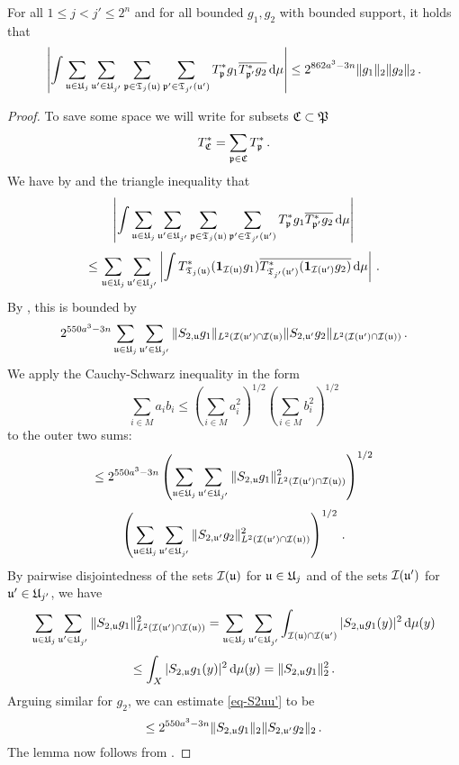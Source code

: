 \begin{lemma}
    \label{row-correlation}
    \leanok
    For all $1 \le j < j' \le 2^n$ and for all bounded $g_1, g_2$ with bounded support, it holds that
    $$
        \left| \int \sum_{{\mathfrak u} \in {\mathfrak U}_j} \sum_{{\mathfrak u}' \in {\mathfrak U}_{j'}} \sum_{{\mathfrak p} \in {\mathfrak T}_j({\mathfrak u})} \sum_{{\mathfrak p}' \in {\mathfrak T}_{j'}({\mathfrak u}')} T^*_{{\mathfrak p}} g_1 \overline{T^*_{{\mathfrak p}'} g_2} \, \mathrm{d}\mu \right| \le
        2^{862a^3-3n}\|g_1\|_2 \|g_2\|_2\,.
    $$
\end{lemma}

\begin{proof}
    To save some space we will write for subsets ${\mathfrak C} \subset {\mathfrak P}$
    $$
        T_{{\mathfrak C}}^* = \sum_{{\mathfrak p} \in {\mathfrak C}} T_{{\mathfrak p}}^*\,.
    $$
    We have by  and the triangle inequality that
    $$
        \left| \int \sum_{{\mathfrak u} \in {\mathfrak U}_j} \sum_{{\mathfrak u}' \in {\mathfrak U}_{j'}} \sum_{{\mathfrak p} \in {\mathfrak T}_j({\mathfrak u})} \sum_{{\mathfrak p}' \in {\mathfrak T}_{j'}({\mathfrak u}')} T^*_{{\mathfrak p}} g_1 \overline{T^*_{{\mathfrak p}'} g_2} \, \mathrm{d}\mu \right|
    $$
    $$
        \le \sum_{{\mathfrak u} \in {\mathfrak U}_j} \sum_{{\mathfrak u}' \in {\mathfrak U}_{j'}} \left| \int T^*_{{\mathfrak T}_j({\mathfrak u})} (\mathbf{1}_{{\mathcal{I}}({\mathfrak u})} g_1) \overline{T^*_{{\mathfrak T}_{j'}({\mathfrak u}')} (\mathbf{1}_{{\mathcal{I}}({\mathfrak u}')} g_2)} \, \mathrm{d}\mu \right|\,.
    $$
    By , this is bounded by
    \begin{equation}
        \label{eq-S2uu'}
         2^{550a^3-3n} \sum_{{\mathfrak u} \in {\mathfrak U}_j} \sum_{{\mathfrak u}' \in {\mathfrak U}_{j'}} \|S_{2,{\mathfrak u}} g_1\|_{L^2({\mathcal{I}}({\mathfrak u}')\cap {\mathcal{I}}({\mathfrak u})} \|S_{2, {\mathfrak u}'} g_2\|_{L^2({\mathcal{I}}({\mathfrak u}')\cap{\mathcal{I}}({\mathfrak u}))}\,.
    \end{equation}
    We apply the Cauchy-Schwarz inequality in the form
    \begin{equation*}
        \sum_{i \in M} a_i b_i \le (\sum_{i \in M} a_i^2 )^{1/2}(\sum_{i \in M} b_i^2 )^{1/2}
    \end{equation*} to the outer two sums:
    $$
        \le 2^{550a^3-3n} \left(\sum_{{\mathfrak u} \in {\mathfrak U}_j} \sum_{{\mathfrak u}' \in {\mathfrak U}_{j'}} \|S_{2,{\mathfrak u}} g_1\|_{L^2({\mathcal{I}}({\mathfrak u}')\cap {\mathcal{I}}({\mathfrak u}))}^2 \right)^{1/2}
    $$
    $$
        \left(\sum_{{\mathfrak u} \in {\mathfrak U}_j} \sum_{{\mathfrak u}' \in {\mathfrak U}_{j'}} \|S_{2,{\mathfrak u}'} g_2\|_{L^2({\mathcal{I}}({\mathfrak u}')\cap{\mathcal{I}}({\mathfrak u}))}^2 \right)^{1/2}\,.
    $$
    By pairwise disjointedness of the sets ${\mathcal{I}}({\mathfrak u})$ for ${\mathfrak u} \in {\mathfrak U}_j$ and of the sets ${\mathcal{I}}({\mathfrak u}')$ for ${\mathfrak u}' \in {\mathfrak U}_{j'}$, we have
    $$
        \sum_{{\mathfrak u} \in {\mathfrak U}_j}\sum_{{\mathfrak u}' \in {\mathfrak U}_{j'}} \|S_{2,{\mathfrak u}} g_1\|_{L^2({\mathcal{I}}({\mathfrak u}')\cap {\mathcal{I}}({\mathfrak u}))}^2
        = \sum_{{\mathfrak u} \in {\mathfrak U}_j}\sum_{{\mathfrak u}' \in {\mathfrak U}_{j'}} \int_{{\mathcal{I}}({\mathfrak u}) \cap {\mathcal{I}}({\mathfrak u}')} |S_{2,{\mathfrak u}} g_1(y)|^2 \, \mathrm{d}\mu(y)
    $$
    $$
        \le \int_X |S_{2,{\mathfrak u}}g_1(y)|^2 \, \mathrm{d}\mu(y) = \|S_{2,{\mathfrak u}} g_1\|_2^2\,.
    $$
    Arguing similar for $g_2$, we can estimate \eqref{eq-S2uu'} to be
    $$
        \le 2^{550a^3-3n} \|S_{2,{\mathfrak u}}g_1\|_2 \|S_{2,{\mathfrak u}'} g_2\|_2\,.
    $$
    The lemma now follows from .
\end{proof}

